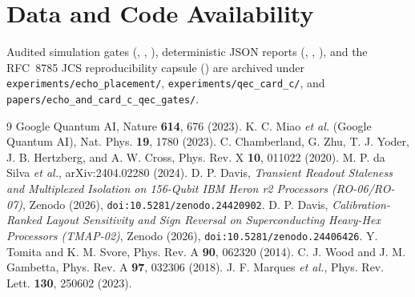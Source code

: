 \documentclass[aps,prx,twocolumn,superscriptaddress,nofootinbib]{revtex4-2}
\begin{document}
\section*{Data and Code Availability}
Audited simulation gates (\ecqEchoPySha, \ecqQecPySha, \ecqLruPySha), deterministic JSON reports (\ecqEchoRepSha, \ecqQecRepSha, \ecqLruRepSha), and the RFC~8785 JCS reproducibility capsule (\ecqCapsuleSha) are archived under \texttt{experiments/echo\_placement/}, \texttt{experiments/qec\_card\_c/}, and \texttt{papers/echo\_and\_card\_c\_qec\_gates/}.

\begin{thebibliography}{9}
 Google Quantum AI, Nature \textbf{614}, 676 (2023).
 K. C. Miao \emph{et al.} (Google Quantum AI), Nat. Phys. \textbf{19}, 1780 (2023).
 C. Chamberland, G. Zhu, T. J. Yoder, J. B. Hertzberg, and A. W. Cross, Phys. Rev. X \textbf{10}, 011022 (2020).
 M. P. da Silva \emph{et al.}, arXiv:2404.02280 (2024).
 D. P. Davis, \emph{Transient Readout Staleness and Multiplexed Isolation on 156-Qubit IBM Heron r2 Processors (RO-06/RO-07)}, Zenodo (2026), \texttt{doi:10.5281/zenodo.24420902}.
 D. P. Davis, \emph{Calibration-Ranked Layout Sensitivity and Sign Reversal on Superconducting Heavy-Hex Processors (TMAP-02)}, Zenodo (2026), \texttt{doi:10.5281/zenodo.24406426}.
 Y. Tomita and K. M. Svore, Phys. Rev. A \textbf{90}, 062320 (2014).
 C. J. Wood and J. M. Gambetta, Phys. Rev. A \textbf{97}, 032306 (2018).
 J. F. Marques \emph{et al.}, Phys. Rev. Lett. \textbf{130}, 250602 (2023).
\end{thebibliography}
\end{document}
